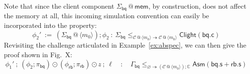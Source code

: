 \documentclass[acmsmall,screen,review,anonymous]{acmart}
\newcommand{\kw}[1]{\ensuremath{ \mathsf{#1} }}
\begin{document}
\begin{example}
Note that since the client component
$\Sigma_\kw{bq} \mathbin@ \kw{mem}$,
by construction,
does not affect the memory at all,
this incoming simulation convention
can easily be incorporated into the property:
\[
  \phi_2' \: := \:
    (\Sigma_\kw{bq} \mathbin@ \langle m_0 \rangle)
    \mathbin;
    \phi_2
  \: : \:
  \Sigma_\kw{bq}
    \le_{\mathcal{C} \mathbin@ \langle m_0 \rangle
         \twoheadrightarrow
         \mathcal{C} \mathbin@ \langle m_0 \rangle}
    \kw{Clight}(\kw{bq.c})
\]
Revisiting the challenge articulated in Example~\ref{ex:abspec},
we can then give the proof shown in Fig.~X:
\[
  \phi_1'
  \:\mathbin;\:
  (\phi_2 \mathbin; \pi_\kw{bq}) \odot
  (\phi_\kw{rb} \mathbin; \pi_\kw{rb}) \odot z
  \:\mathbin;\:
  \ell
  \quad : \quad
  \Gamma_\kw{bq}
  \le_{\varnothing \twoheadrightarrow
       (\mathcal{C} \mathbin@ \langle m_0 \rangle) \mathbin; \mathbb{C}}
  \kw{Asm}(\kw{bq.s} + \kw{rb.s})
\]
\end{example}
\end{document}
